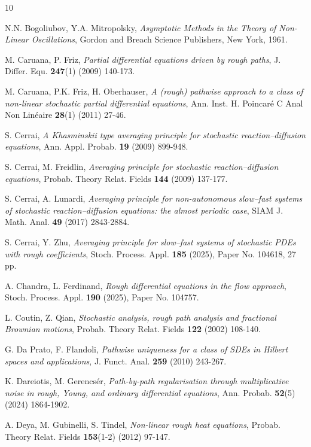 \documentclass[10pt,a4paper]{article}
\numberwithin{equation}{section}
\begin{document}
\begin{thebibliography}{10}


 N.N. Bogoliubov, Y.A. Mitropolsky, \emph{Asymptotic Methods in the Theory of Non-Linear Oscillations}, Gordon and Breach Science Publishers, New York, 1961.


 M. Caruana, P. Friz, \emph{Partial differential equations driven by rough paths}, J. Differ. Equ. {\bf 247}(1) (2009) 140-173.


 M. Caruana, P.K. Friz, H. Oberhauser, \emph{A (rough) pathwise approach to a class of non-linear stochastic partial differential equations}, Ann. Inst. H. Poincar\'{e} C Anal Non Lin\'{e}aire {\bf 28}(1) (2011) 27-46.


 S. Cerrai, \emph{A Khasminskii type averaging principle for stochastic reaction--diffusion equations}, Ann. Appl. Probab. {\bf 19} (2009) 899-948.


 S. Cerrai, M. Freidlin, \emph{Averaging principle for stochastic reaction--diffusion equations}, Probab. Theory Relat. Fields {\bf 144} (2009) 137-177.


 S. Cerrai, A. Lunardi, \emph{Averaging principle for non-autonomous slow--fast systems of stochastic reaction--diffusion equations: the almost periodic case}, SIAM J. Math. Anal. {\bf 49} (2017) 2843-2884.


 S. Cerrai, Y. Zhu, \emph{Averaging principle for slow--fast systems of stochastic PDEs with rough coefficients}, Stoch. Process. Appl. {\bf 185} (2025), Paper No. 104618, 27 pp.

 A. Chandra, L. Ferdinand, \emph{Rough differential equations in the flow approach}, Stoch. Process. Appl. {\bf 190} (2025), Paper No. 104757. 


 L. Coutin, Z. Qian, \emph{Stochastic analysis, rough path analysis and fractional Brownian motions}, Probab. Theory Relat. Fields {\bf 122} (2002) 108-140.


 G. Da Prato, F. Flandoli, \emph{Pathwise uniqueness for a class of SDEs in Hilbert spaces and applications}, J. Funct. Anal. {\bf 259} (2010) 243-267.


 K. Dareiotis, M. Gerencs\'{e}r, \emph{Path-by-path regularisation through multiplicative noise in rough, Young, and ordinary differential equations}, Ann. Probab. {\bf 52}(5) (2024) 1864-1902.


 A. Deya, M. Gubinelli, S. Tindel, \emph{Non-linear rough heat equations}, Probab. Theory Relat. Fields {\bf 153}(1-2) (2012) 97-147.



\end{thebibliography}
\end{document}
